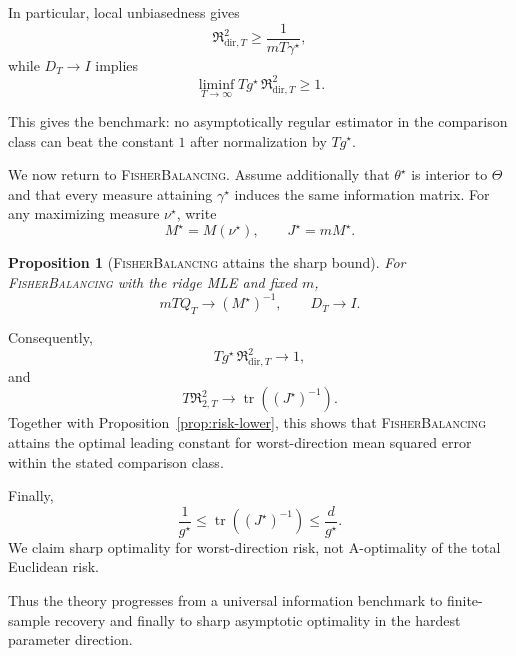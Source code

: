 \documentclass[10pt,twoside,letterpaper]{article}
\newtheorem{proposition}{Proposition}
\newcommand{\tr}{\operatorname{tr}}
\newcommand{\FB}{\textnormal{\textsc{FisherBalancing}}}
\newcommand{\gstar}{g^\star}
\newcommand{\Rdir}{\mathfrak R_{\mathrm{dir},T}}
\newcommand{\Rtwo}{\mathfrak R_{2,T}}
\begin{document}
In particular, local unbiasedness gives
\begin{equation}
\mathfrak R_{\mathrm{dir},T}^2
\ge
\frac1{mT\gamma^\star},
\end{equation}
while $D_T\to I$ implies
\begin{equation}
\liminf_{T\to\infty}
T\gstar\,
\mathfrak R_{\mathrm{dir},T}^2
\ge
1.
\label{eq:asymptotic-lower}
\end{equation}

This gives the benchmark: no asymptotically regular estimator in the
comparison class can beat the constant $1$ after normalization by
$T\gstar$.

We now return to \FB{}. Assume additionally that $\theta^\star$ is
interior to $\Theta$ and that every measure attaining $\gamma^\star$
induces the same information matrix. For any maximizing measure
$\nu^\star$, write
\begin{equation}
M^\star
=
M(\nu^\star),
\qquad
J^\star
=
mM^\star.
\end{equation}

\begin{proposition}[\FB{} attains the sharp bound]
\label{prop:efficiency}
For \FB{} with the ridge MLE and fixed $m$,
\begin{equation}
mTQ_T
\longrightarrow
(M^\star)^{-1},
\qquad
D_T
\longrightarrow
I.
\label{eq:mse-matrix}
\end{equation}
\end{proposition}

Consequently,
\begin{equation}
T\gstar\,\Rdir^2
\longrightarrow
1,
\label{eq:sharp-directional-risk}
\end{equation}
and
\begin{equation}
T\Rtwo^2
\longrightarrow
\tr\!\left(
(J^\star)^{-1}
\right).
\label{eq:sharp-euclidean-risk}
\end{equation}
Together with Proposition~\ref{prop:risk-lower}, this shows that
\FB{} attains the optimal leading constant for worst-direction mean
squared error within the stated comparison class.

Finally,
\begin{equation}
\frac1{\gstar}
\le
\tr\!\left(
(J^\star)^{-1}
\right)
\le
\frac d{\gstar}.
\end{equation}
We claim sharp optimality for worst-direction risk, not A-optimality of
the total Euclidean risk.

Thus the theory progresses from a universal information benchmark to
finite-sample recovery and finally to sharp asymptotic optimality in
the hardest parameter direction.
\end{document}
